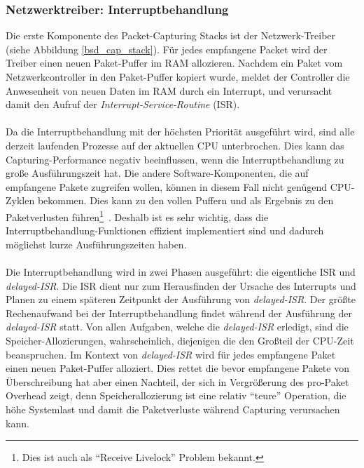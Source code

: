 \subsubsection{Netzwerktreiber: Interruptbehandlung}\label{sec:intr_behandlung}
Die erste Komponente des Packet-Capturing Stacks ist der Netzwerk-Treiber
(siehe Abbildung \ref{bsd_cap_stack}). Für jedes empfangene Packet wird der
Treiber einen neuen Paket-Puffer im RAM allozieren. Nachdem ein Paket
vom Netzwerkcontroller in den Paket-Puffer kopiert wurde, meldet der Controller
die Anwesenheit von neuen Daten im RAM durch ein Interrupt, und verursacht
damit den Aufruf der \emph{Interrupt-Service-Routine} (ISR).\\\\ 
%
Da die Interruptbehandlung mit der höchsten Priorität ausgeführt wird, sind
alle derzeit laufenden Prozesse auf der aktuellen CPU unterbrochen. Dies kann
das Capturing-Performance negativ beeinflussen, wenn die Interruptbehandlung zu
große  Ausführungszeit hat. Die andere Software-Komponenten, die auf empfangene
Pakete zugreifen wollen, können in diesem Fall nicht genügend CPU-Zyklen
bekommen.  Dies kann zu den vollen Puffern und als Ergebnis zu den
Paketverlusten führen\footnote{Dies ist auch als ``Receive Livelock'' Problem
bekannt.}~\cite{elim_recv_lock}. Deshalb ist es sehr wichtig, dass die
Interruptbehandlung-Funktionen effizient implementiert sind und dadurch
möglichst kurze Ausführungszeiten haben.\\\\
%
Die Interruptbehandlung wird in zwei Phasen ausgeführt: die eigentliche ISR und
\emph{delayed-ISR}. Die ISR dient nur zum Herausfinden der Ursache des
Interrupts und Planen zu einem späteren Zeitpunkt der Ausführung von
\emph{delayed-ISR}. Der größte Rechenaufwand bei der Interruptbehandlung findet
während der Ausführung der \emph{delayed-ISR} statt.  Von allen Aufgaben, welche
die \emph{delayed-ISR} erledigt, sind die Speicher-Allozierungen,
wahrscheinlich, diejenigen die den Großteil der CPU-Zeit beanspruchen. Im Kontext von \emph{delayed-ISR} wird für jedes empfangene
Paket einen neuen Paket-Puffer alloziert. Dies rettet die bevor empfangene
Pakete von Überschreibung hat aber einen Nachteil, der sich in Vergrößerung des
pro-Paket Overhead zeigt, denn Speicherallozierung ist eine relativ ``teure''
Operation, die höhe Systemlast und damit die Paketverluste während Capturing
verursachen kann.
%
